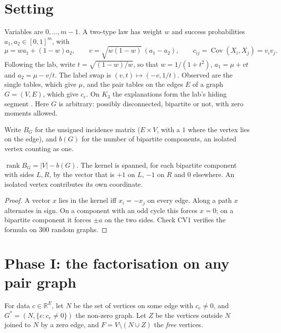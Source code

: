 \documentclass[11pt]{article}
\theoremstyle{definition}\newtheorem{definition}[theorem]{Definition}\newtheorem{remark}[theorem]{Remark}\newtheorem{example}[theorem]{Example}
\newcommand{\R}{\mathbb R}
\begin{document}
\section{Setting}\label{sec:setting}
Variables are $0,\dots,m-1$. A two-type law has weight $w$ and success probabilities $a_1,a_2\in[0,1]^m$, with
\[
\mu=wa_1+(1-w)a_2,\qquad v=\sqrt{w(1-w)}\,(a_1-a_2),\qquad c_{ij}=\operatorname{Cov}(X_i,X_j)=v_iv_j .
\]
Following the lab, write $t=\sqrt{(1-w)/w}$, so that $w=1/(1+t^2)$, $a_1=\mu+vt$ and $a_2=\mu-v/t$. The label swap is
$(v,t)\mapsto(-v,1/t)$. Observed are the single tables, which give $\mu$, and the pair tables on the edges $E$ of a graph $G=(V,E)$,
which give $c_e$. On $K_3$ the explanations form the lab's hiding segment \cite[Theorem A]{Lab}. Here $G$ is arbitrary: possibly
disconnected, bipartite or not, with zero moments allowed.

Write $B_G$ for the unsigned incidence matrix ($E\times V$, with a $1$ where the vertex lies on the edge), and $b(G)$ for the number of
bipartite components, an isolated vertex counting as one.

\begin{lemma}[rank]\label{lem:rank}
$\operatorname{rank}B_G=|V|-b(G)$. The kernel is spanned, for each bipartite component with sides $L,R$, by the vector that is $+1$ on
$L$, $-1$ on $R$ and $0$ elsewhere. An isolated vertex contributes its own coordinate.
\end{lemma}

\begin{proof}
A vector $x$ lies in the kernel iff $x_i=-x_j$ on every edge. Along a path $x$ alternates in sign. On a component with an odd cycle this
forces $x=0$; on a bipartite component it forces $\pm a$ on the two sides. Check CV1 verifies the formula on $300$ random graphs.
\end{proof}

\section{Phase I: the factorisation on any pair graph}\label{sec:factor}
For data $c\in\R^E$, let $N$ be the set of vertices on some edge with $c_e\ne0$, and $G^*=(N,\{e:c_e\ne0\})$ the non-zero graph. Let $Z$ be
the vertices outside $N$ joined to $N$ by a zero edge, and $F=V\setminus(N\cup Z)$ the \emph{free} vertices.
\end{document}
